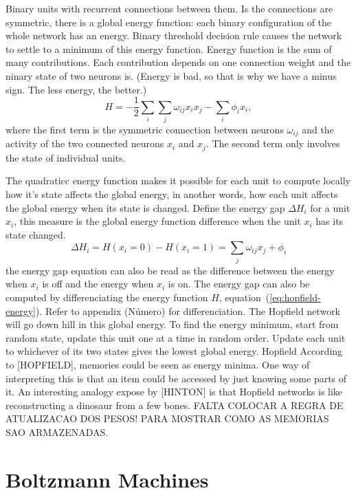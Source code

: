 Binary units with recurrent connections between them.
Is the connections are symmetric, there is a global energy function: each binary configuration of the whole network has an energy. Binary threshold decision rule causes the network to settle to a minimum of this energy function.
Energy function is the sum of many contributions. Each contribution depends on one connection weight and the ninary state of two neurons is. (Energy is bad, so that is why we have a minus sign. The less energy, the better.)
\begin{equation}\label{eq:hopfield-energy}
  H = -\frac{1}{2}\sum_{i} \sum_{j} \omega_{ij} x_{i} x_{j} - \sum_{i} \phi_{i} x_{i},
\end{equation}
where the first term is the symmetric connection between neurons $\omega_{ij}$ and the activity of the two connected neurons $x_{i}$ and $x_{j}$. The second term only involves the state of individual units.

The quadraticc energy function makes it possible for each unit to compute locally how it's state affects the global energy, in another words, how each unit affects the global energy when its state is changed. Define the energy gap $\Delta H_{i}$ for a unit $x_{i}$, this measure is the global energy function difference when the unit $x_{i}$ has its state changed.
\begin{equation}\label{eq:hopfield-energy-gap}
  \Delta H_{i} = H(x_{i} = 0) - H(x_{i} = 1) = \sum_{j} \omega_{ij} x_{j} + \phi_{i}
\end{equation}
the energy gap equation can also be read as the difference between the energy when $x_{i}$ is off and the energy when $x_{i}$ is on. The energy gap can also be computed by differenciating the energy function $H$, equation~(\ref{eq:hopfield-energy}). Refer to appendix (N\'{u}mero) for differenciation.
The Hopfield network will go down hill in this global energy. To find the energy minimum, start from random state, update this unit one at a time in random order. Update each unit to whichever of its two states gives the lowest global energy.
Hopfield
According to [HOPFIELD], memories could be seen as energy minima. One way of interpreting this is that an item could be accessed by just knowing some parts of it. An interesting analogy expose by [HINTON] is that Hopfield networks is like reconstructing a dinosaur from a few bones. FALTA COLOCAR A REGRA DE ATUALIZACAO DOS PESOS\@! PARA MOSTRAR COMO AS MEMORIAS SAO ARMAZENADAS.\@


 

\section{Boltzmann Machines}

